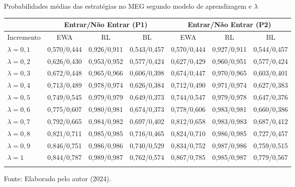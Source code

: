 \begin{tabela}[H]
	\small
	\centering
	\caption{Probabilidades médias das estratégias no MEG segundo modelo de aprendizagem e $\lambda$}
	\begin{tabular}{l|c c c|c c c}
		\Xhline{2\arrayrulewidth}
		& \multicolumn{3}{c|}{Entrar/Não Entrar (P1)} & \multicolumn{3}{c}{Entrar/Não Entrar (P2)} \\ 
		\hline
		Incremento & EWA & RL & BL & EWA & RL & BL \\ \hline
		$\lambda = 0,1$ & 0,570/0,444 & 0,926/0,911 & 0,543/0,457 & 0,570/0,444 & 0,927/0,911 & 0,544/0,457 \\
		$\lambda = 0,2$ & 0,626/0,430 & 0,953/0,952 & 0,577/0,424 & 0,627/0,429 & 0,960/0,951 & 0,577/0,424 \\
		$\lambda = 0,3$ & 0,672/0,448 & 0,965/0,966 & 0,606/0,398 & 0,674/0,447 & 0,970/0,965 & 0,603/0,401 \\
		$\lambda = 0,4$ & 0,713/0,489 & 0,978/0,974 & 0,626/0,384 & 0,712/0,490 & 0,971/0,974 & 0,627/0,383 \\
		$\lambda = 0,5$ & 0,749/0,545 & 0,979/0,979 & 0,649/0,373 & 0,744/0,547 & 0,979/0,978 & 0,647/0,376 \\
		$\lambda = 0,6$ & 0,775/0,607 & 0,980/0,981 & 0,674/0,373 & 0,778/0,606 & 0,983/0,981 & 0,660/0,386 \\
		$\lambda = 0,7$ & 0,792/0,665 & 0,984/0,982 & 0,697/0,402 & 0,812/0,658 & 0,983/0,983 & 0,687/0,412 \\
		$\lambda = 0,8$ & 0,821/0,711 & 0,985/0,985 & 0,716/0,465 & 0,824/0,710 & 0,986/0,985 & 0,727/0,457 \\
		$\lambda = 0,9$ & 0,846/0,751 & 0,986/0,986 & 0,740/0,529 & 0,834/0,752 & 0,987/0,986 & 0,759/0,515 \\
		$\lambda = 1$ & 0,844/0,787 & 0,989/0,987 & 0,762/0,574 & 0,867/0,785 & 0,985/0,987 & 0,779/0,567 \\
		\Xhline{2\arrayrulewidth}
	\end{tabular}
	\label{tabela_8}
	\caption*{\fontsize{10}{12}\selectfont Fonte: Elaborado pelo autor (2024).}
\end{tabela}
